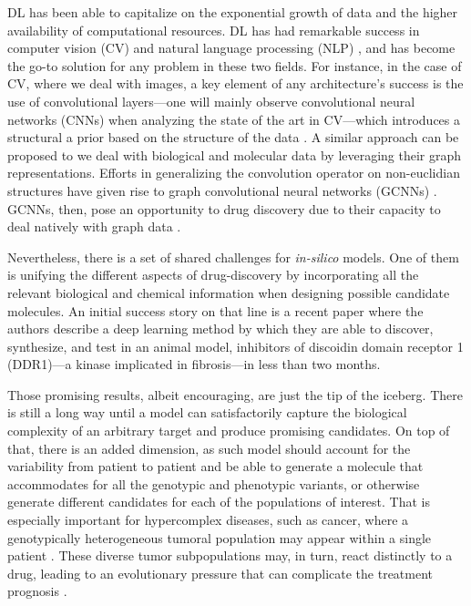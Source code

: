 \documentclass{article}
\begin{document}
DL has been able to capitalize on the exponential growth of data and the higher
 availability of computational resources. DL has had remarkable success in computer
 vision (CV) \cite{Guo2016} and natural language processing (NLP) \cite{Young2018}, and
 has become the go-to solution for any problem in these two fields. For instance, in the
 case of CV, where we deal with images, a key element of any architecture's success is
 the use of convolutional layers---one will mainly observe convolutional neural networks
 (CNNs) when analyzing the state of the art in CV---which introduces a structural a
 prior based on the structure of the data \cite{Fukushima1980, LeCun1989, Ulyanov}. A
 similar approach can be proposed to we deal with biological and molecular data by
 leveraging their graph representations. Efforts in generalizing the convolution
 operator on non-euclidian structures have given rise to graph convolutional neural
 networks (GCNNs) \cite{Wu2019}. GCNNs, then, pose an opportunity to drug discovery due
 to their capacity to deal natively with graph data \cite{Sun2019}.


Nevertheless, there is a set of shared challenges for \emph{in-silico} models. One of
 them is unifying the different aspects of drug-discovery by incorporating all the
 relevant biological and chemical information when designing possible candidate
 molecules. An initial success story on that line is a recent paper
 \cite{Zhavoronkov2019} where the authors describe a deep learning method by which they
 are able to discover, synthesize, and test in an animal model, inhibitors of discoidin
 domain receptor 1 (DDR1)—a kinase implicated in fibrosis—in less than two months.

Those promising results, albeit encouraging, are just the tip of the iceberg. There is
 still a long way until a model can satisfactorily capture the biological complexity of
 an arbitrary target and produce promising candidates. On top of that, there is an added
 dimension, as such model should account for the variability from patient to patient and
 be able to generate a molecule that accommodates for all the genotypic and phenotypic
 variants, or otherwise generate different candidates for each of the populations of
 interest. That is especially important for hypercomplex diseases, such as cancer, where
 a genotypically heterogeneous tumoral population may appear within a single patient
 \cite{Boland2017}. These diverse tumor subpopulations may, in turn, react distinctly to
 a drug, leading to an evolutionary pressure that can complicate the treatment prognosis
 \cite{Enriquez-Navas2015}.
\end{document}
